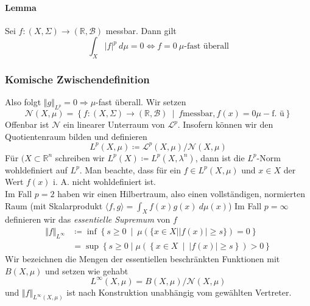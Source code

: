 \documentclass[12pt,a4paper,fleqn]{article}
\def\set#1{{\left\{ #1 \right\}}}
\def\Mid{\ \middle|\ }
\begin{document}
\paragraph{Lemma} Sei $f\colon (X, \Sigma) \rightarrow (\mathbb{R}, \mathcal{B})$ messbar. Dann gilt
\begin{displaymath}
\int_X \vert f \vert ^p\ d\mu = 0 \Leftrightarrow f = 0\ \mu \text{-fast überall}
\end{displaymath}

\subsubsection*{Komische Zwischendefinition} 
Also folgt $\Vert g \Vert_{L^p} = 0 \Rightarrow \mu$-fast überall. Wir setzen
\begin{displaymath}
\mathcal{N}(X, \mu) = \set{f\colon (X, \Sigma) \rightarrow (\mathbb{R}, \mathcal{B}) \Mid f \text{messbar}, f(x) = 0 \mu-\text{f. ü}}
\end{displaymath}
Offenbar ist $\mathcal{N}$ ein linearer Unterraum von $\mathscr{L}^p$. Insofern können wir den Quotientenraum bilden und definieren
\begin{displaymath}
L^p(X, \mu) \coloneqq \mathscr{L}^p(X, \mu)/\mathcal{N}(X, \mu)
\end{displaymath}
Für $(X \subset \mathbb{R}^n$ schreiben wir $L^p(X) \coloneqq L^p(X, \lambda^n)$, dann ist die $L^p$-Norm wohldefiniert auf $L^p$.
Man beachte, dass für ein $f \in L^p(X, \mu)$ und $ x\in X$ der Wert $f(x)$ i. A. nicht wohldefiniert ist.\\
Im Fall $p = 2$ haben wir einen Hilbertraum, also einen vollständigen, normierten Raum (mit Skalarprodukt $\langle f, g\rangle = \int_X f(x)g(x)\ d\mu(x)$)
Im Fall $ p = \infty$ definieren wir das \textit{essentielle Supremum} von $f$
\begin{align*}
\Vert f \Vert_{L^\infty} &\coloneqq \inf \set{s \geq 0 \Mid \mu(\{x \in X \mid \vert f(x)\vert \geq s\})=0}\\
&= \sup \set{s\geq 0 \mid \mu(\set{x \in X \Mid \vert f(x) \vert \geq s }) > 0 } 
\end{align*}
Wir bezeichnen die Mengen der essentiellen beschränkten Funktionen mit $B(X, \mu)$ und setzen wie gehabt 
\begin{displaymath}
L^\infty(X, \mu) = B(X, \mu)/\mathcal{N}(X, \mu)
\end{displaymath}
und $\Vert f \Vert_{L^\infty (X, \mu)}$ ist nach Konstruktion unabhängig vom gewählten Vertreter.
\end{document}
